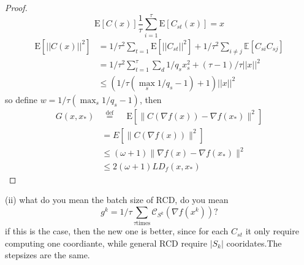 \documentclass[8pt,a4paper]{article}
\newcommand{\E}{\mathbb{E}}
\begin{document}
	\begin{proof}
		$$\mathrm{E}[C(x)]\frac{1}{\tau}\sum_{i=1}^{\tau}\mathrm{E}[C_{st}(x)]=x$$
		$$
		\begin{aligned}
		\mathrm{E}[||C(x)||^2]&=1/\tau^2\sum_{t=1}\mathrm{E}[||C_{st}||^2]+1/\tau^2\sum_{i\neq j}\E[C_{si}C_{sj}]\\
		&=1/\tau^2\sum_{t=1}^{\tau}\sum_{d}1/q_sx_s^2+(\tau-1)/\tau||x||^2\\
		&\leq (1/\tau(\max_s 1/q_s-1)+1) ||x||^2
		\end{aligned}
		$$
		so define $w=1/\tau(\max_s 1/q_s-1)$, then
		\begin{equation*}
			\begin{aligned}
				G(x, x_*) & \stackrel{\text { def }}{=} \quad \mathrm{E}\left[\|C(\nabla f(x))-\nabla f(x_*)\|^{2}\right] \\
				&=E\left[\|C(\nabla f(x))\|^{2}\right] \\
				& \leq(\omega+1)\|\nabla f(x)-\nabla f(x_*)\|^{2} \\
				& \leq 2(\omega+1) L D_{f}(x, x_*)
			\end{aligned}
		\end{equation*}
	\end{proof}
	
	(ii)
	what do you mean the batch size of RCD, do you mean 
	\begin{equation}
		g^k=1/\tau\sum_{\tau\text {times}}\mathcal{C}_{S^{k}}\left(\nabla f\left(x^{k}\right)\right)?
	\end{equation}
	if this is the case, then the new one is better, since for each $C_{st}$ it only require computing one coordiante, while general RCD require $|S_k|$ cooridates.The stepsizes are the same.
	
	
\end{document}
